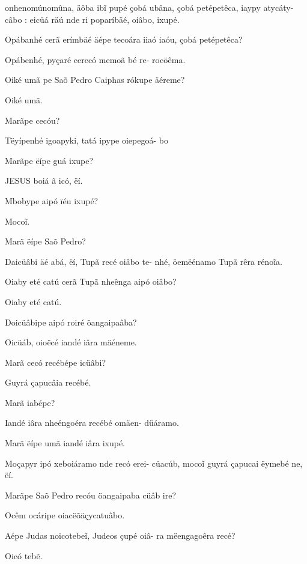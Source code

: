 \documentclass[openany,titlepage,12pt]{book}
\begin{document}
\begin{altereven}
        onhenomúnomûna, äôba ib\~i pupé çobá
        ubâna, çobá petépetêca, iaypy atycáty-\linebreak
        câbo : eicüá räú nde ri poparíbäé, oiâbo,
        ixupé.
    \item Opábanhé cerã erímbäé äépe
        tecoára iiaó iaóu, çobá petépetêca?
    \item Opábenhé, pyçaré cerecó memoã bé re-
        rocöêma.
    \item Oiké umã pe Saõ Pedro Caiphas rókupe
        äéreme?
    \item Oiké umã.
    \item Marãpe cecóu?
    \item Tëyípenhé igoapyki, tatá ipype oiepegoá-
        bo
    \item Marãpe ëípe guá ixupe?
    \item JESUS boiá ã icó, ëí.
    \item Mbobype aipó ïéu ixupé?
    \item Moco\~i.
    \item Marã ëípe Saõ Pedro?
    \item Daicüâbi äé abá, ëí, Tupã recé oiâbo te-
        nhé, öemëénamo Tupã rêra réno\~ia.
    \item Oiaby eté catú cerã Tupã nheênga aipó oiâbo?
    \item Oiaby eté catú.
    \item Doicüâbipe aipó roiré öangaipaâba?
    \item Oicüáb, oioëcé iandé iâra mäéneme.
    \item Marã cecó recébépe icüâbi?
    \item Guyrá çapucâia recébé.
    \item Marã iabépe?
    \item Iandé iâra nheéngoéra recébé omäen-\linebreak
        düáramo.
    \item Marã ëípe umã iandé iâra ixupé.
    \item Moçapyr ipó xeboiáramo nde recó erei-
        cüacúb, moco\~i guyrá çapucai ëymebé\linebreak 
        ne, ëí.
    \item Marãpe Saõ Pedro recóu öangaipaba\linebreak
        cüâb ire?
    \item Ocêm ocáripe oiacëõäçycatuâbo.
    \item Aépe Judas noicotebe\~i, Judeos çupé oiâ-
        ra mëengagoêra recé?
    \item Oicó teb\~e.

\end{altereven}
\end{document}
